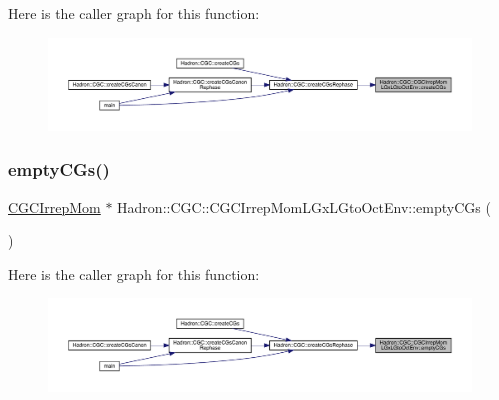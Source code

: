 Here is the caller graph for this function\+:\nopagebreak
\begin{figure}[H]
\begin{center}
\leavevmode
\includegraphics[width=350pt]{d1/d0f/namespaceHadron_1_1CGC_1_1CGCIrrepMomLGxLGtoOctEnv_a326be3440106df05ce61c23e713f7312_icgraph}
\end{center}
\end{figure}
\mbox{\label{namespaceHadron_1_1CGC_1_1CGCIrrepMomLGxLGtoOctEnv_afd66508df18d3aba9ecfc7d3ad09e448}} 
\subsubsection{\texorpdfstring{emptyCGs()}{emptyCGs()}}
{\footnotesize\ttfamily \mbox{\hyperlink{classHadron_1_1CGCIrrepMom}{C\+G\+C\+Irrep\+Mom}} $\ast$ Hadron\+::\+C\+G\+C\+::\+C\+G\+C\+Irrep\+Mom\+L\+Gx\+L\+Gto\+Oct\+Env\+::empty\+C\+Gs (\begin{DoxyParamCaption}{ }\end{DoxyParamCaption})}

Here is the caller graph for this function\+:\nopagebreak
\begin{figure}[H]
\begin{center}
\leavevmode
\includegraphics[width=350pt]{d1/d0f/namespaceHadron_1_1CGC_1_1CGCIrrepMomLGxLGtoOctEnv_afd66508df18d3aba9ecfc7d3ad09e448_icgraph}
\end{center}
\end{figure}
